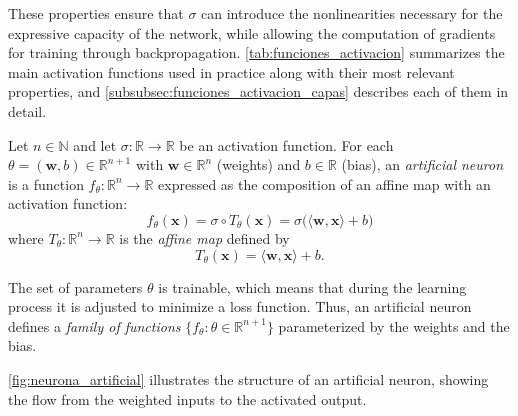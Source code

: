 These properties ensure that $\sigma$ can introduce the nonlinearities necessary for the expressive capacity of the network, while allowing the computation of gradients for training through backpropagation. \autoref{tab:funciones_activacion} summarizes the main activation functions used in practice along with their most relevant properties, and \autoref{subsubsec:funciones_activacion_capas} describes each of them in detail.

\begin{definition}\label{def:neurona_artificial}
	Let $n \in \mathbb{N}$ and let $\sigma: \mathbb{R} \to \mathbb{R}$ be an activation function. For each $\theta = (\mathbf{w}, b) \in \mathbb{R}^{n+1}$ with $\mathbf{w} \in \mathbb{R}^n$ (weights) and $b \in \mathbb{R}$ (bias), an \textit{artificial neuron} is a function $f_{\theta}: \mathbb{R}^n \to \mathbb{R}$ expressed as the composition of an affine map with an activation function:
	\begin{equation}
		f_{\theta}(\mathbf{x}) = \sigma \circ T_{\theta}(\mathbf{x}) = \sigma\Big( \langle \mathbf{w}, \mathbf{x} \rangle + b \Big)
		\label{eq:neuron_formal}
	\end{equation}
	where $T_{\theta}: \mathbb{R}^n \to \mathbb{R}$ is the \textit{affine map} defined by
	\[
	T_{\theta}(\mathbf{x}) = \langle \mathbf{w}, \mathbf{x} \rangle + b.
	\]
\end{definition}

The set of parameters $\theta$ is trainable, which means that during the learning process it is adjusted to minimize a loss function. Thus, an artificial neuron defines a \textit{family of functions} $\{f_{\theta} : \theta \in \mathbb{R}^{n+1}\}$ parameterized by the weights and the bias.

\autoref{fig:neurona_artificial} illustrates the structure of an artificial neuron, showing the flow from the weighted inputs to the activated output.

